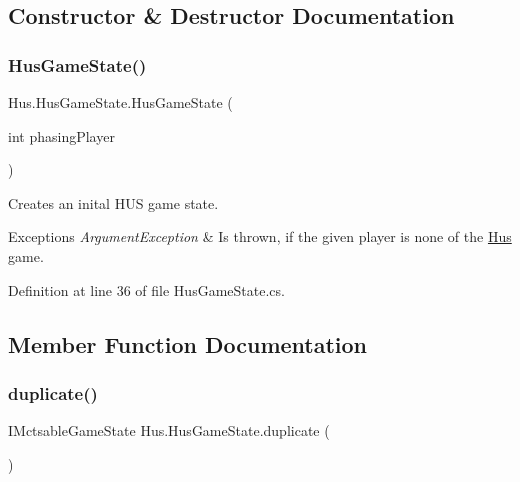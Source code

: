 \subsection{Constructor \& Destructor Documentation}
\mbox{\label{class_hus_1_1_hus_game_state_ac27c230e200f6c857cd8187c5ffd4cb3}} 
\subsubsection{\texorpdfstring{Hus\+Game\+State()}{HusGameState()}}
{\footnotesize\ttfamily Hus.\+Hus\+Game\+State.\+Hus\+Game\+State (\begin{DoxyParamCaption}\item[{int}]{phasing\+Player }\end{DoxyParamCaption})}



Creates an inital H\+US game state. 


\begin{DoxyExceptions}{Exceptions}
{\em Argument\+Exception} & Is thrown, if the given player is none of the \mbox{\hyperlink{namespace_hus}{Hus}} game.\\
\hline
\end{DoxyExceptions}


Definition at line 36 of file Hus\+Game\+State.\+cs.



\subsection{Member Function Documentation}
\mbox{\label{class_hus_1_1_hus_game_state_ad519755bf09bbc5d4da38aceb3dd27b4}} 
\subsubsection{\texorpdfstring{duplicate()}{duplicate()}}
{\footnotesize\ttfamily I\+Mctsable\+Game\+State Hus.\+Hus\+Game\+State.\+duplicate (\begin{DoxyParamCaption}{ }\end{DoxyParamCaption})}



